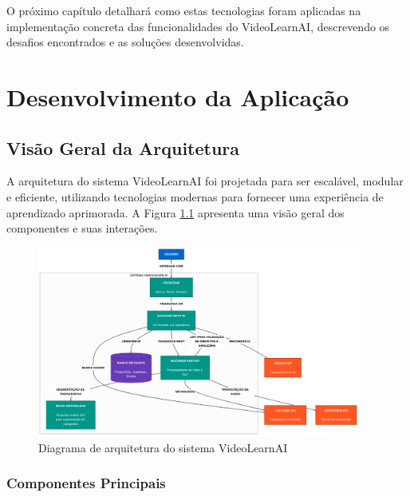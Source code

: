 \documentclass[tcc,capa]{texufpel}
\begin{document}
O próximo capítulo detalhará como estas tecnologias foram aplicadas na implementação concreta das funcionalidades do VideoLearnAI, descrevendo os desafios encontrados e as soluções desenvolvidas.














\chapter{Desenvolvimento da Aplicação}

\section{Visão Geral da Arquitetura}

A arquitetura do sistema VideoLearnAI foi projetada para ser escalável, modular e eficiente, utilizando tecnologias modernas para fornecer uma experiência de aprendizado aprimorada. A Figura \ref{fig:architecture} apresenta uma visão geral dos componentes e suas interações.

\begin{figure}[H]
  \centering
  \includegraphics[width=0.95\textwidth,height=0.9\textheight,keepaspectratio]{exemplo-slides/graphics/images/c4_simplified-1.png}
  \caption{Diagrama de arquitetura do sistema VideoLearnAI}
  \label{fig:architecture}
\end{figure}

\subsection{Componentes Principais}
\end{document}
